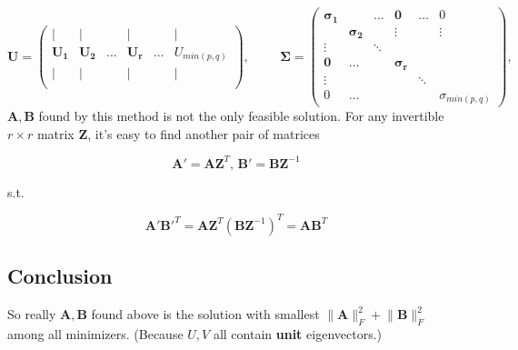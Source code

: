 \documentclass[11pt]{report}
\begin{document}
$$\mathbf{U} =
\begin{pmatrix}
| & | & & |& & | \\
\mathbf{U_1}& \mathbf{U_2} & \hdots & \mathbf{U_r} & \hdots & U_{min(p,q)} \\
| & | & & |& & | \\
\end{pmatrix}, \hspace{1cm} 
\mathbf{\Sigma} =
\begin{pmatrix}
\mathbf{\sigma_1}  &                    &  \hdots  & \mathbf{0}       &   \hdots    &  0              \\
                   & \mathbf{\sigma_2}  &          & \vdots           &             &      \vdots     \\
   \vdots          &                    & \ddots   &                  &             &                 \\
   \mathbf{0}      & \hdots             &          &\mathbf{\sigma_r} &             &                 \\
  \vdots           &                    &          &                  & \ddots      &                 \\
  0                &\hdots              &          &                  &             &\sigma_{min(p,q)}

\end{pmatrix},
$$
$\mathbf{A}, \mathbf{B}$ found by this method is not the only feasible solution. For any invertible $r \times r$ matrix $\mathbf{Z}$, it's easy to find another pair of matrices 

$$\mathbf{A'}=\mathbf{AZ}^T,\,\mathbf{B'}=\mathbf{BZ}^{-1}$$

s.t.

$$\mathbf{A'B'}^T=\mathbf{AZ}^T(\mathbf{BZ}^{-1})^T=\mathbf{AB}^T$$

\subsection{Conclusion}

So really $\mathbf{A}, \mathbf{B}$ found above is the solution with smallest $\lVert \mathbf{A} \rVert_F^2+\lVert \mathbf{B} \rVert_F^2$ among all minimizers. (Because $U, V$ all contain \textbf{unit} eigenvectors.)
\end{document}
